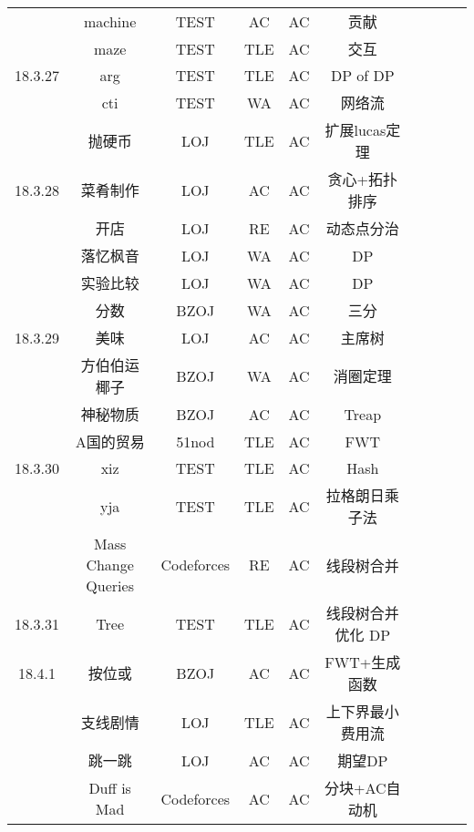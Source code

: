 \documentclass[landscape]{article}
\begin{document}
\begin{longtable}{cccccccccc}
  & machine & TEST & AC & AC & 贡献\\
  & maze & TEST & TLE & AC & 交互\\
  \hline
  18.3.27 & arg & TEST & TLE & AC & DP of DP\\
  & cti & TEST & WA & AC & 网络流\\
  & 抛硬币 & LOJ & TLE & AC & 扩展lucas定理\\
  \hline
  18.3.28 & 菜肴制作 & LOJ & AC & AC & 贪心+拓扑排序\\
  & 开店 & LOJ & RE & AC & 动态点分治\\
  & 落忆枫音 & LOJ & WA & AC & DP\\
  & 实验比较 & LOJ & WA & AC & DP\\
  & 分数 & BZOJ & WA & AC & 三分\\
  \hline
  18.3.29 & 美味 & LOJ & AC & AC & 主席树\\
  & 方伯伯运椰子 & BZOJ & WA & AC & 消圈定理\\
  & 神秘物质 & BZOJ & AC & AC & Treap\\
  & A国的贸易 & 51nod & TLE & AC & FWT\\
  \hline
  18.3.30 & xiz & TEST & TLE & AC & Hash\\
  & yja & TEST & TLE & AC & 拉格朗日乘子法\\
  & Mass Change Queries & Codeforces & RE & AC & 线段树合并\\
  \hline
  18.3.31 & Tree & TEST & TLE & AC & 线段树合并优化 DP\\
  \hline
  18.4.1 & 按位或 & BZOJ & AC & AC & FWT+生成函数\\
  & 支线剧情 & LOJ & TLE & AC & 上下界最小费用流\\
  & 跳一跳 & LOJ & AC & AC & 期望DP\\
  & Duff is Mad & Codeforces & AC & AC & 分块+AC自动机\\
  
\end{longtable}
\end{document}
